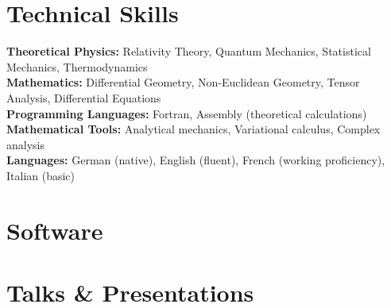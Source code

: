 \documentclass[letterpaper,11pt]{article}
\begin{document}
\nocite{*}
\printbibliography[heading=none,prenote=symbols]
\fi


\ifcv
\section*{Technical Skills}

\textbf{Theoretical Physics:} Relativity Theory, Quantum Mechanics, Statistical Mechanics, Thermodynamics \\
\textbf{Mathematics:} Differential Geometry, Non-Euclidean Geometry, Tensor Analysis, Differential Equations \\
\textbf{Programming Languages:} Fortran, Assembly (theoretical calculations) \\
\textbf{Mathematical Tools:} Analytical mechanics, Variational calculus, Complex analysis \\
\textbf{Languages:} German (native), English (fluent), French (working proficiency), Italian (basic)
\fi


\ifcv
\section*{Software}

\begin{itemize}
\end{itemize}
\fi


\ifcv
\section*{Talks \& Presentations}

\begin{itemize}
\end{itemize}
\fi
\end{document}
